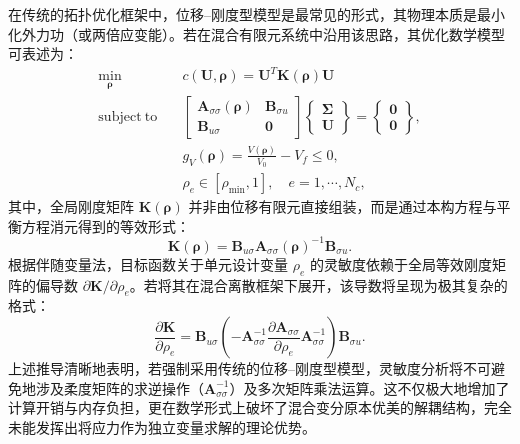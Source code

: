 在传统的拓扑优化框架中，位移{--}刚度型模型是最常见的形式，其物理本质是最小化外力功（或两倍应变能）。若在混合有限元系统中沿用该思路，其优化数学模型可表述为：
\[
\begin{aligned} 
	\min_{\boldsymbol{\rho}} \quad & c(\boldsymbol{U},\boldsymbol{\rho}) = \boldsymbol{U}^T\boldsymbol{K}(\boldsymbol{\rho})\boldsymbol{U} \\ 
	\mathrm{subject~to} \quad & 
	\begin{bmatrix}
		\boldsymbol{A}_{\sigma\sigma}(\boldsymbol{\rho}) & \boldsymbol{B}_{\sigma{u}}\\
		\boldsymbol{B}_{u\sigma} & \boldsymbol{0}
	\end{bmatrix}
	\begin{Bmatrix}
		\boldsymbol\Sigma\\
		\boldsymbol{U}
	\end{Bmatrix} =  
	\begin{Bmatrix}
		\boldsymbol{0}\\
		\boldsymbol{0}
	\end{Bmatrix},\\
	& g_V(\boldsymbol{\rho}) = \frac{V(\boldsymbol{\rho})}{V_0} - V_f \leq 0,\\ 
	& \rho_e \in [\rho_{\min}, 1],\quad{e}=1,\cdots,N_c,
\end{aligned}
\]
其中，全局刚度矩阵 $\boldsymbol{K}(\boldsymbol{\rho})$ 并非由位移有限元直接组装，而是通过本构方程与平衡方程消元得到的等效形式：
\[
\boldsymbol{K}(\boldsymbol{\rho}) = \boldsymbol{B}_{u\sigma}\boldsymbol{A}_{\sigma\sigma}(\boldsymbol{\rho})^{-1}\boldsymbol{B}_{\sigma{u}}.
\]
根据伴随变量法，目标函数关于单元设计变量 $\rho_e$ 的灵敏度依赖于全局等效刚度矩阵的偏导数 $\partial \boldsymbol{K} / \partial \rho_e$。若将其在混合离散框架下展开，该导数将呈现为极其复杂的格式：
\[
\frac{\partial \boldsymbol{K}}{\partial \rho_e} = \boldsymbol{B}_{u\sigma} \left( -\boldsymbol{A}_{\sigma\sigma}^{-1} \frac{\partial \boldsymbol{A}_{\sigma\sigma}}{\partial \rho_e} \boldsymbol{A}_{\sigma\sigma}^{-1} \right) \boldsymbol{B}_{\sigma u}.
\]
上述推导清晰地表明，若强制采用传统的位移{--}刚度型模型，灵敏度分析将不可避免地涉及柔度矩阵的求逆操作（$\boldsymbol{A}_{\sigma\sigma}^{-1}$）及多次矩阵乘法运算。这不仅极大地增加了计算开销与内存负担，更在数学形式上破坏了混合变分原本优美的解耦结构，完全未能发挥出将应力作为独立变量求解的理论优势。

